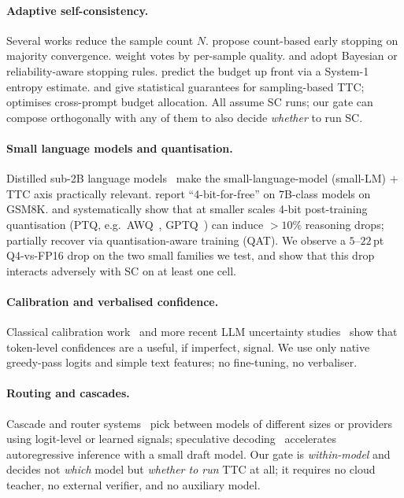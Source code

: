\documentclass[11pt]{article}
\begin{document}
\paragraph{Adaptive self-consistency.}
Several works reduce the sample count $N$.
\citet{Aggarwal2023AdaptiveConsistency} propose count-based early
stopping on majority convergence. \citet{Wan2024RASC} weight votes by
per-sample quality. \citet{Aghazadeh2025CGES} and
\citet{Kim2026ReASC} adopt Bayesian or reliability-aware stopping
rules. \citet{Ji2025SeerSC} predict the budget up front via a
System-1 entropy estimate. \citet{Zhou2025RPC} and
\citet{Cordero2025Certified} give statistical guarantees for
sampling-based TTC; \citet{Liu2026PETS} optimises cross-prompt budget
allocation. All assume SC runs; our gate can compose orthogonally
with any of them to also decide \emph{whether} to run SC.

\paragraph{Small language models and quantisation.}
Distilled sub-2B language models~\citep{Xu2025Phi4Mini,
Zhu2024EoTD,Wang2025EffCoT,Kang2025T1,DeepSeekR1} make the
small-language-model (small-LM) ${+}$ TTC axis practically relevant.
\citet{RedHatQuant2024} report ``4-bit-for-free'' on 7B-class models
on GSM8K. \citet{Li2025QuantMath} and \citet{Li2025QuantMitigate}
systematically show that at smaller scales 4-bit post-training
quantisation (PTQ, e.g.\ AWQ~\citep{Lin2024AWQ},
GPTQ~\citep{Frantar2023GPTQ}) can induce $>10\%$ reasoning drops;
\citet{Lv2026QAT} partially recover via quantisation-aware training
(QAT).
We observe a $5$--$22$\,pt Q4-vs-FP16 drop on the two small families
we test, and show that this drop interacts adversely with SC on at
least one cell.

\paragraph{Calibration and verbalised confidence.}
Classical calibration
work~\citep{Guo2017Calibration,Kadavath2022Know} and more recent LLM
uncertainty studies~\citep{Xiong2023Uncertainty,
Chuang2024ConfidenceRoute} show that token-level confidences are a
useful, if imperfect, signal. We use only native greedy-pass logits
and simple text features; no fine-tuning, no verbaliser.

\paragraph{Routing and cascades.}
Cascade and router systems~\citep{Zheng2025CITER,She2025TokenRouter,
Ong2024RouteLLM,Chen2024FrugalGPT,Jiang2023LLMBlender} pick between
models of different sizes or providers using logit-level or learned
signals; speculative decoding~\citep{Leviathan2023Speculative}
accelerates autoregressive inference with a small draft model. Our
gate is \emph{within-model} and decides not \emph{which} model but
\emph{whether to run} TTC at all; it requires no cloud teacher, no
external verifier, and no auxiliary model.
\end{document}
